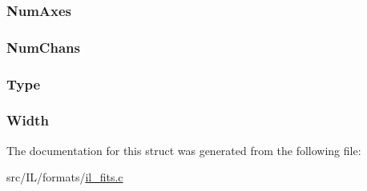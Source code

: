 \hypertarget{struct_f_i_t_s_h_e_a_d_ab141743634f89bdf4f7c4870245458e4}{
\subsubsection[{Num\-Axes}]{ Num\-Axes}}\label{struct_f_i_t_s_h_e_a_d_ab141743634f89bdf4f7c4870245458e4}
\hypertarget{struct_f_i_t_s_h_e_a_d_a4cf59287266f4d82f9ad279b98f7d457}{
\subsubsection[{Num\-Chans}]{ Num\-Chans}}\label{struct_f_i_t_s_h_e_a_d_a4cf59287266f4d82f9ad279b98f7d457}
\hypertarget{struct_f_i_t_s_h_e_a_d_a437e4fc3b579e2e7879dedd0fd2ac587}{
\subsubsection[{Type}]{ Type}}\label{struct_f_i_t_s_h_e_a_d_a437e4fc3b579e2e7879dedd0fd2ac587}
\hypertarget{struct_f_i_t_s_h_e_a_d_a0bebc214dbd5f199ad36aefd13feb6e7}{
\subsubsection[{Width}]{ Width}}\label{struct_f_i_t_s_h_e_a_d_a0bebc214dbd5f199ad36aefd13feb6e7}


The documentation for this struct was generated from the following file\-:\begin{DoxyCompactItemize}
\item 
src/\-I\-L/formats/\hyperlink{il__fits_8c}{il\-\_\-fits.\-c}\end{DoxyCompactItemize}
